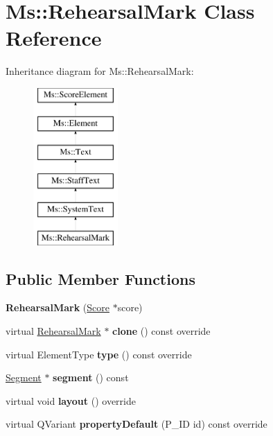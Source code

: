 \hypertarget{class_ms_1_1_rehearsal_mark}{}\section{Ms\+:\+:Rehearsal\+Mark Class Reference}
\label{class_ms_1_1_rehearsal_mark}
Inheritance diagram for Ms\+:\+:Rehearsal\+Mark\+:\begin{figure}[H]
\begin{center}
\leavevmode
\includegraphics[height=6.000000cm]{class_ms_1_1_rehearsal_mark}
\end{center}
\end{figure}
\subsection*{Public Member Functions}
\begin{DoxyCompactItemize}
\item 
\mbox{\label{class_ms_1_1_rehearsal_mark_ada3f84de83a50e6a544e6fe2691f7fad}} 
{\bfseries Rehearsal\+Mark} (\hyperlink{class_ms_1_1_score}{Score} $\ast$score)
\item 
\mbox{\label{class_ms_1_1_rehearsal_mark_a517520dd1598fca99ff9f7516964a9a5}} 
virtual \hyperlink{class_ms_1_1_rehearsal_mark}{Rehearsal\+Mark} $\ast$ {\bfseries clone} () const override
\item 
\mbox{\label{class_ms_1_1_rehearsal_mark_a47ccbc7225ae7e027b966eb4c00d27e7}} 
virtual Element\+Type {\bfseries type} () const override
\item 
\mbox{\label{class_ms_1_1_rehearsal_mark_a24869589f6f26eeaa689b8e0dc8b2a58}} 
\hyperlink{class_ms_1_1_segment}{Segment} $\ast$ {\bfseries segment} () const
\item 
\mbox{\label{class_ms_1_1_rehearsal_mark_ae27c68792a2ddb40c1282b6c72ff5928}} 
virtual void {\bfseries layout} () override
\item 
\mbox{\label{class_ms_1_1_rehearsal_mark_af0f849925c37649c08a4810d8107ec95}} 
virtual Q\+Variant {\bfseries property\+Default} (P\+\_\+\+ID id) const override
\end{DoxyCompactItemize}
